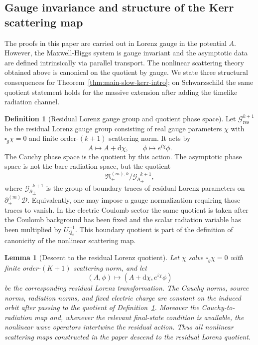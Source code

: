 \documentclass[11pt]{article}
\numberwithin{equation}{section}
\theoremstyle{plain}
\newtheorem{lemma}[theorem]{Lemma}
\theoremstyle{definition}
\newtheorem{definition}{Definition}[section]
\theoremstyle{remark}
\newcommand{\dd}{\mathrm{d}}
\newcommand{\Gbdry}{\mathcal G_{\partial}}
\begin{document}
\subsection{Gauge invariance and structure of the Kerr scattering map}\label{subsec:gauge-structure}


The proofs in this paper are carried out in Lorenz gauge in the potential $A$.
However, the Maxwell-Higgs system is gauge invariant and the asymptotic data are defined intrinsically via parallel transport.
The nonlinear scattering theory obtained above is canonical on the quotient by gauge.
We state three structural consequences for Theorem~\ref{thm:main-slow-kerr-intro}; on Schwarzschild the same quotient statement holds for the massive extension after adding the timelike radiation channel.

\begin{definition}[Residual Lorenz gauge group and quotient phase space]\label{def:gauge-quotient}
Let $\mathcal G^{k+1}_{\mathrm{res}}$ be the residual Lorenz gauge group consisting of real gauge parameters $\chi$ with $\square_g\chi=0$ and finite order-$(k+1)$ scattering norm. It acts by
\begin{equation}
A\mapsto A+\dd\chi,
\qquad
\phi\mapsto e^{i\chi}\phi.
\end{equation}
The Cauchy phase space is the quotient by this action. The asymptotic phase space is not the bare radiation space, but the quotient
\begin{equation}
\mathfrak R_{\pm}^{(m),k}/{\Gbdry}_{\pm}^{k+1},
\end{equation}
where ${\Gbdry}_{\pm}^{k+1}$ is the group of boundary traces of residual Lorenz parameters on $\partial_{\pm}^{(m)}\mathcal D$. Equivalently, one may impose a gauge normalization requiring those traces to vanish. In the electric Coulomb sector the same quotient is taken after the Coulomb background has been fixed and the scalar radiation variable has been multiplied by \(U_{Q_e}^{-1}\).  This boundary quotient is part of the definition of canonicity of the nonlinear scattering map.
\end{definition}

\begin{lemma}[Descent to the residual Lorenz quotient]\label{lem:residual-gauge-descent}
Let \(\chi\) solve \(\square_g\chi=0\) with finite order-\((K+1)\) scattering norm, and let
\begin{equation}
 (A,\phi)\mapsto(A+\dd\chi,e^{i\chi}\phi)
\end{equation}
be the corresponding residual Lorenz transformation.  The Cauchy norms, source norms, radiation norms, and fixed electric charge are constant on the induced orbit after passing to the quotient of Definition~\ref{def:gauge-quotient}.  Moreover the Cauchy-to-radiation map and, whenever the relevant final-state condition is available, the nonlinear wave operators intertwine the residual action.  Thus all nonlinear scattering maps constructed in the paper descend to the residual Lorenz quotient.
\end{lemma}
\end{document}
